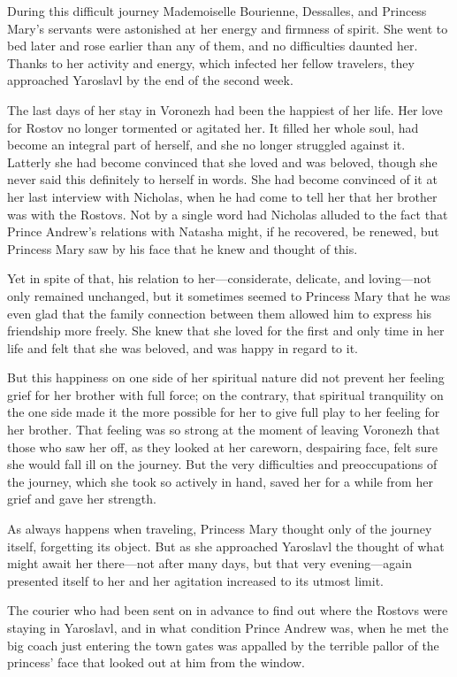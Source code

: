 During this difficult journey Mademoiselle Bourienne, Dessalles,
and Princess Mary's servants were astonished at her energy and
firmness of spirit. She went to bed later and rose earlier than
any of them, and no difficulties daunted her. Thanks to her
activity and energy, which infected her fellow travelers, they
approached Yaroslavl by the end of the second week.

The last days of her stay in Voronezh had been the happiest of
her life.  Her love for Rostov no longer tormented or agitated
her. It filled her whole soul, had become an integral part of
herself, and she no longer struggled against it. Latterly she had
become convinced that she loved and was beloved, though she never
said this definitely to herself in words. She had become
convinced of it at her last interview with Nicholas, when he had
come to tell her that her brother was with the Rostovs. Not by a
single word had Nicholas alluded to the fact that Prince Andrew's
relations with Natasha might, if he recovered, be renewed, but
Princess Mary saw by his face that he knew and thought of this.

Yet in spite of that, his relation to her---considerate,
delicate, and loving---not only remained unchanged, but it
sometimes seemed to Princess Mary that he was even glad that the
family connection between them allowed him to express his
friendship more freely. She knew that she loved for the first and
only time in her life and felt that she was beloved, and was
happy in regard to it.

But this happiness on one side of her spiritual nature did not
prevent her feeling grief for her brother with full force; on the
contrary, that spiritual tranquility on the one side made it the
more possible for her to give full play to her feeling for her
brother. That feeling was so strong at the moment of leaving
Voronezh that those who saw her off, as they looked at her
careworn, despairing face, felt sure she would fall ill on the
journey. But the very difficulties and preoccupations of the
journey, which she took so actively in hand, saved her for a
while from her grief and gave her strength.

As always happens when traveling, Princess Mary thought only of
the journey itself, forgetting its object. But as she approached
Yaroslavl the thought of what might await her there---not after
many days, but that very evening---again presented itself to her
and her agitation increased to its utmost limit.

The courier who had been sent on in advance to find out where the
Rostovs were staying in Yaroslavl, and in what condition Prince
Andrew was, when he met the big coach just entering the town
gates was appalled by the terrible pallor of the princess' face
that looked out at him from the window.


